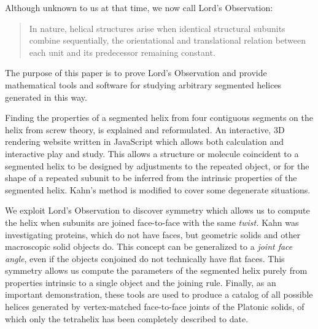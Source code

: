\documentclass[11pt]{article}
\begin{document}
{Although unknown to us at that time, we now call Lord's Observation:
\begin{quote}
  In nature, helical structures arise when identical structural subunits combine sequentially, the orientational and translational relation between each unit
  and its predecessor remaining constant.\cite{lord2002helical}
\end{quote}
The purpose of this paper is to prove Lord's Observation and provide mathematical tools and software for studying arbitrary
segmented helices generated in this way.

Finding the properties of a segmented helix from four contiguous segments on the helix from screw theory\cite{abbasi2015review,wittenburg2016kinematics,wiki:screwaxis,kahn1989defining},
is explained and reformulated. An interactive, 3D rendering website written in JavaScript which allows both calculation and
interactive play and study\cite{segmentedhelixinteractive}. This allows
a structure or molecule coincident to a segmented helix to be designed
by adjustments to the repeated object, or for the shape of
a repeated subunit to be inferred from the intrinsic properties of the
segmented helix.
Kahn's method \cite{kahn1989defining} is modified to cover some degenerate situations.

We exploit Lord's Observation to discover symmetry which allows us to compute the helix when subunits are joined face-to-face with
the same {\em twist.} Kahn was investigating proteins, which do not have faces, but geometric solids and other macroscopic solid objects do.
This concept can be generalized to a {\em joint face angle}, even if the
objects conjoined do not technically have flat faces.
This symmetry allows us compute the parameters of the segmented helix purely from
properties intrinsic to a single object and the joining rule.
Finally, as an important demonstration, these tools are used to produce
a catalog of all possible helices generated by vertex-matched face-to-face joints of the
Platonic solids, of which only the tetrahelix\cite{coxeter1985simplicial,sadler2013periodic,fuller1982synergetics,read2018transforming,pearce1990structure}
has been completely described to date.

}
\end{document}
